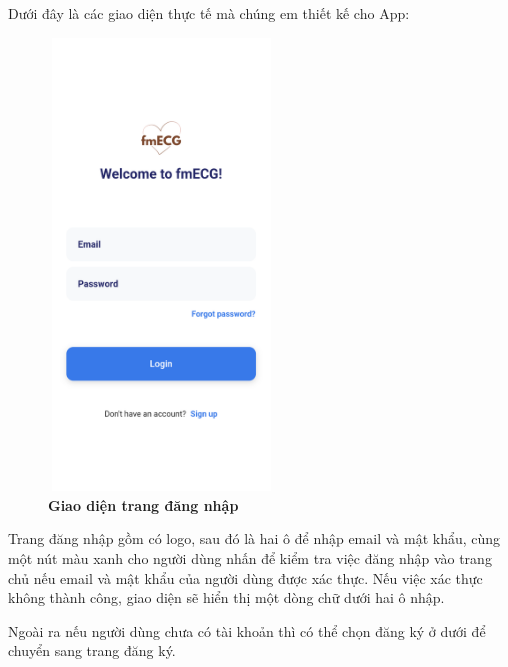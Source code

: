 Dưới đây là các giao diện thực tế mà chúng em thiết kế cho App:
\begin{figure}[H]
  \centering
  \includegraphics[width=6cm,height=12cm]{Images/mobile_app/demo/login.png}
  \caption[Giao diện trang đăng nhập]{\bfseries \fontsize{12pt}{0pt}\selectfont Giao diện trang đăng nhập}
  \label{demo_login} %
\end{figure}

Trang đăng nhập gồm có logo, sau đó là hai ô để nhập email và mật khẩu, cùng một nút màu xanh cho người dùng nhấn để kiểm tra 
việc đăng nhập vào
trang chủ nếu email và mật khẩu của người dùng được xác thực. Nếu việc xác thực không thành công, giao diện sẽ hiển thị
một dòng chữ dưới hai ô nhập.

Ngoài ra nếu người dùng chưa có tài khoản thì có thể chọn đăng ký ở dưới để chuyển sang trang đăng ký.

